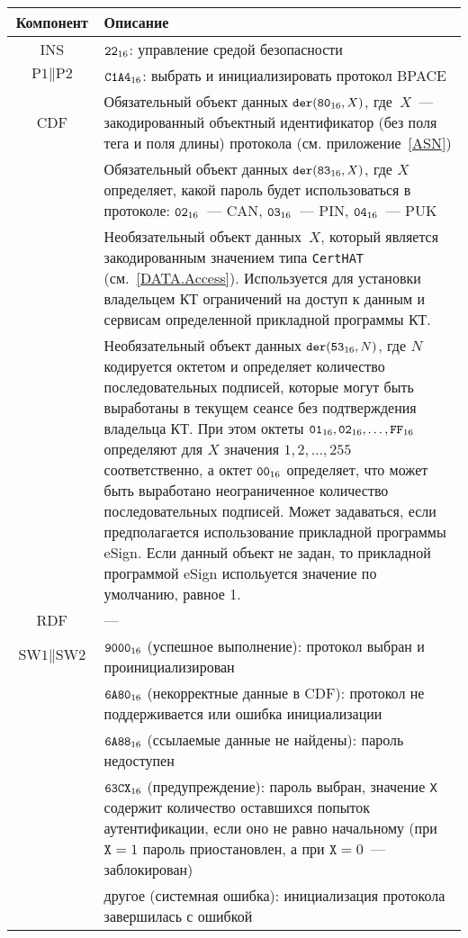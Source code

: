 \noindent
\begin{tabular}{|c|p{14cm}|}
\hline
Компонент & Описание \\
\hline
\hline
INS & $\texttt{22}_{16}$: управление средой безопасности\\ 
\hline
$\text{P1} \parallel\text{P2}$ & $\texttt{C1A4}_{16}$: выбрать и 
инициализировать протокол BPACE\\ 
\hline
CDF & Обязательный объект данных 
$\texttt{der}(\texttt{80}_{16}, X)$, где~$X$~--- 
закодированный объектный идентификатор (без поля тега и поля 
длины) протокола (см. приложение~\ref{ASN})\\
& Обязательный объект данных $\texttt{der}(\texttt{83}_{16}, X)$, 
где $X$ определяет, какой пароль будет использоваться в протоколе: 
$\texttt{02}_{16}$~--- CAN,  $\texttt{03}_{16}$~--- PIN, 
$\texttt{04}_{16}$~--- PUK\\
 & Необязательный объект данных~$X$, который является 
закодированным значением типа \verb|CertHAT| (см.~\ref{DATA.Access}). 
Используется для установки владельцем 
КТ ограничений на доступ к данным и сервисам определенной 
прикладной программы КТ.\\
 & Необязательный объект данных $\texttt{der}(\texttt{53}_{16}, N)$, 
где $N$ кодируется октетом и 
определяет количество последовательных подписей, 
которые могут быть выработаны в текущем сеансе 
без подтверждения владельца КТ.
При этом октеты $\texttt{01}_{16}, \texttt{02}_{16}, \ldots, \texttt{FF}_{16}$
определяют для $X$ значения $1, 2, \ldots, 255$ соответственно, 
а октет $\texttt{00}_{16}$ определяет, что может быть выработано 
неограниченное количество последовательных подписей. 
Может задаваться, если предполагается использование 
прикладной программы eSign.  
Если данный объект не задан, то прикладной программой eSign 
испольуется значение по умолчанию, равное 1. \\
\hline \hline
RDF &  --- \\
\hline
$\text{SW1} \parallel \text{SW2}$ & 
$\texttt{9000}_{16}$ (успешное выполнение): протокол выбран и 
проинициализирован \\
 & $\texttt{6A80}_{16}$ (некорректные данные в CDF): протокол не поддерживается или 
ошибка инициализации \\
 & $\texttt{6A88}_{16}$ (ссылаемые данные не найдены): пароль недоступен \\
 & $\texttt{63CX}_{16}$ (предупреждение): пароль выбран, 
значение \texttt{X} содержит количество 
оставшихся попыток аутентификации, если оно не равно начальному 
(при $\texttt{X} = 1$ пароль приостановлен, а при $\texttt{X} = 0$~--- заблокирован)\\
 & другое (системная ошибка): инициализация протокола завершилась с 
ошибкой\\
\hline
\end{tabular}

